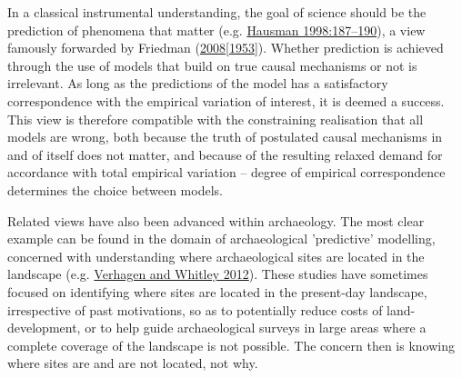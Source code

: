 \documentclass[
  12pt,
  a4paper,
  oneside]{book}
\begin{document}
In a classical instrumental understanding, the goal of science should be the prediction of phenomena that matter (e.g. \protect\hyperlink{ref-hausman1998}{Hausman 1998:187--190}), a view famously forwarded by Friedman (\protect\hyperlink{ref-friedman1953}{2008{[}1953{]}}). Whether prediction is achieved through the use of models that build on true causal mechanisms or not is irrelevant. As long as the predictions of the model has a satisfactory correspondence with the empirical variation of interest, it is deemed a success. This view is therefore compatible with the constraining realisation that all models are wrong, both because the truth of postulated causal mechanisms in and of itself does not matter, and because of the resulting relaxed demand for accordance with total empirical variation -- degree of empirical correspondence determines the choice between models.

Related views have also been advanced within archaeology. The most clear example can be found in the domain of archaeological 'predictive' modelling, concerned with understanding where archaeological sites are located in the landscape (e.g. \protect\hyperlink{ref-verhagen2012}{Verhagen and Whitley 2012}). These studies have sometimes focused on identifying where sites are located in the present-day landscape, irrespective of past motivations, so as to potentially reduce costs of land-development, or to help guide archaeological surveys in large areas where a complete coverage of the landscape is not possible. The concern then is knowing where sites are and are not located, not why.
\end{document}

